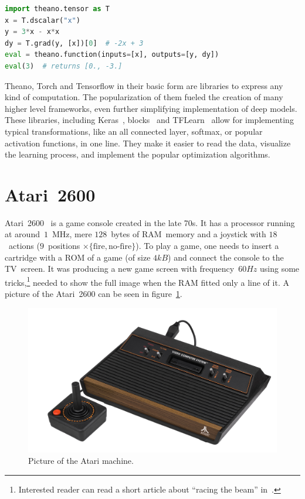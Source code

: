 \begin{lstlisting}[language=Python, caption=Example Theano code.,label={theano-code}
]
import theano.tensor as T
x = T.dscalar("x")
y = 3*x - x*x
dy = T.grad(y, [x])[0]  # -2x + 3
eval = theano.function(inputs=[x], outputs=[y, dy])
eval(3)  # returns [0., -3.]
\end{lstlisting}

Theano, Torch and Tensorflow in their basic form are libraries to express any kind of computation. The popularization of them fueled the creation of many higher level frameworks, even further simplifying implementation of deep models. These libraries, including Keras~\cite{keras}, blocks~\cite{blocks} and TFLearn~\cite{tflearn} allow for implementing typical transformations, like an all connected layer, softmax, or popular activation functions, in one line. They make it easier to read the data, visualize the learning process, and implement the popular optimization algorithms.

\section{Atari~2600}
Atari~2600~\cite{atari} is a game console created in the late 70s. It has a processor running at around~$1$~MHz, mere $128$~bytes of RAM~memory and a joystick with $18$~actions ($9$~positions $\times \{\mbox{fire}, \mbox{no-fire}\}$). To play a game, one needs to insert a cartridge with a ROM of a game (of size $4kB$) and connect the console to the TV~screen. It was producing a new game screen with frequency~$60Hz$ using some tricks,\footnote{Interested reader can read a short article about ``racing the beam'' in~\cite{racing-beam}.} needed to show the full image when the RAM fitted only a line of it. A picture of the Atari~2600 can be seen in figure~\ref{atari-picture}.

\begin{figure}
  \centering
  \includegraphics[width=.8\linewidth]{images/atari.jpg}
  \caption{Picture of the Atari machine.}\label{atari-picture}
\end{figure}

